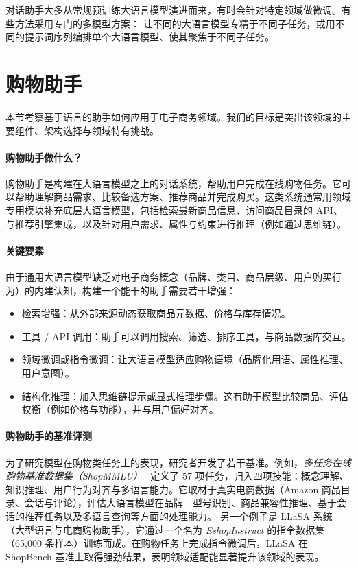 对话助手大多从常规预训练大语言模型演进而来，有时会针对特定领域做微调。有些方法采用专门的多模型方案：
让不同的大语言模型专精于不同子任务，或用不同的提示词序列编排单个大语言模型、使其聚焦于不同子任务。


\section{购物助手}

本节考察基于语言的助手如何应用于电子商务领域。我们的目标是突出该领域的主要组件、架构选择与领域特有挑战。

\paragraph{购物助手做什么？}
购物助手是构建在大语言模型之上的对话系统，帮助用户完成在线购物任务。它可以帮助理解商品需求、比较备选方案、推荐商品并完成购买。这类系统通常用领域专用模块补充底层大语言模型，包括检索最新商品信息、访问商品目录的 API、与推荐引擎集成，以及针对用户需求、属性与约束进行推理（例如通过思维链）。

\paragraph{关键要素}
由于通用大语言模型缺乏对电子商务概念（品牌、类目、商品层级、用户购买行为）的内建认知，构建一个能干的助手需要若干增强：
\begin{itemize}
  \item 检索增强：从外部来源动态获取商品元数据、价格与库存情况。
  \item 工具 / API 调用：助手可以调用搜索、筛选、排序工具，与商品数据库交互。
  \item 领域微调或指令微调：让大语言模型适应购物语境（品牌化用语、属性推理、用户意图）。
  \item 结构化推理：加入思维链提示或显式推理步骤。这有助于模型比较商品、评估权衡（例如价格与功能），并与用户偏好对齐。
\end{itemize}

\paragraph{购物助手的基准评测}
为了研究模型在购物类任务上的表现，研究者开发了若干基准。例如，\emph{多任务在线购物基准数据集（ShopMMLU）}~\citep{jin2024shopping} 定义了 57 项任务，归入四项技能：概念理解、知识推理、用户行为对齐与多语言能力。它取材于真实电商数据（Amazon 商品目录、会话与评论），评估大语言模型在品牌—型号识别、商品兼容性推理、基于会话的推荐任务以及多语言查询等方面的处理能力。
另一个例子是 LLaSA 系统（大型语言与电商购物助手）\citep{zhang2024llasa}，它通过一个名为 {\em EshopInstruct} 的指令数据集（65,000 条样本）训练而成。在购物任务上完成指令微调后，LLaSA 在 ShopBench 基准上取得强劲结果，表明领域适配能显著提升该领域的表现。

